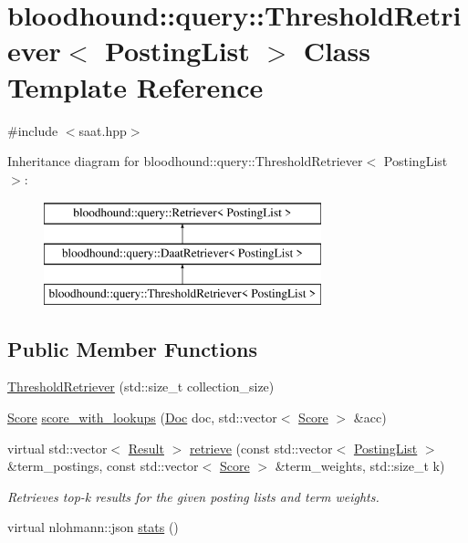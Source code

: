 \hypertarget{classbloodhound_1_1query_1_1ThresholdRetriever}{}\section{bloodhound\+:\+:query\+:\+:Threshold\+Retriever$<$ Posting\+List $>$ Class Template Reference}
\label{classbloodhound_1_1query_1_1ThresholdRetriever}


{\ttfamily \#include $<$saat.\+hpp$>$}

Inheritance diagram for bloodhound\+:\+:query\+:\+:Threshold\+Retriever$<$ Posting\+List $>$\+:\begin{figure}[H]
\begin{center}
\leavevmode
\includegraphics[height=3.000000cm]{classbloodhound_1_1query_1_1ThresholdRetriever}
\end{center}
\end{figure}
\subsection*{Public Member Functions}
\begin{DoxyCompactItemize}
\item 
\mbox{\hyperlink{classbloodhound_1_1query_1_1ThresholdRetriever_a425d17d048e1fd3fd8157450c99df5bc}{Threshold\+Retriever}} (std\+::size\+\_\+t collection\+\_\+size)
\item 
\mbox{\hyperlink{structbloodhound_1_1Score}{Score}} \mbox{\hyperlink{classbloodhound_1_1query_1_1ThresholdRetriever_ac0a8731d270c477e04f24b89850a7d4a}{score\+\_\+with\+\_\+lookups}} (\mbox{\hyperlink{structbloodhound_1_1Doc}{Doc}} doc, std\+::vector$<$ \mbox{\hyperlink{structbloodhound_1_1Score}{Score}} $>$ \&acc)
\item 
virtual std\+::vector$<$ \mbox{\hyperlink{structbloodhound_1_1query_1_1Result}{Result}} $>$ \mbox{\hyperlink{classbloodhound_1_1query_1_1ThresholdRetriever_a06750450e1246e755ebad2d5dac6e8a8}{retrieve}} (const std\+::vector$<$ \mbox{\hyperlink{classbloodhound_1_1PostingList}{Posting\+List}} $>$ \&term\+\_\+postings, const std\+::vector$<$ \mbox{\hyperlink{structbloodhound_1_1Score}{Score}} $>$ \&term\+\_\+weights, std\+::size\+\_\+t k)
\begin{DoxyCompactList}\small\item\em Retrieves top-\/k results for the given posting lists and term weights. \end{DoxyCompactList}\item 
virtual nlohmann\+::json \mbox{\hyperlink{classbloodhound_1_1query_1_1ThresholdRetriever_aa21e5b44d70bfdf058e5f9c5a1abc008}{stats}} ()
\end{DoxyCompactItemize}


